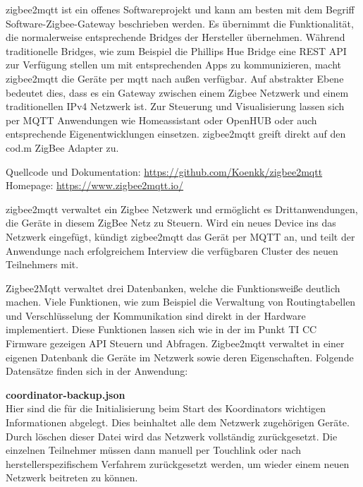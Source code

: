zigbee2mqtt ist ein offenes Softwareprojekt und kann am besten mit dem Begriff \grqq Software-Zigbee-Gateway\grqq{} beschrieben werden. Es übernimmt die Funktionalität, die normalerweise entsprechende
Bridges der Hersteller übernehmen. Während traditionelle Bridges, wie zum Beispiel die Phillips Hue Bridge eine REST API zur Verfügung stellen um mit entsprechenden
Apps zu kommunizieren, macht zigbee2mqtt die Geräte per mqtt nach außen verfügbar. Auf abstrakter Ebene bedeutet dies, dass es ein Gateway zwischen einem Zigbee Netzwerk und
einem traditionellen IPv4 Netzwerk ist. Zur Steuerung und Visualisierung lassen sich per MQTT Anwendungen wie \grqq Homeassistant\grqq{} oder \grqq OpenHUB\grqq{} oder auch entsprechende
Eigenentwicklungen einsetzen. \grqq zigbee2mqtt\grqq{} greift direkt auf den \grqq cod.m\grqq{} ZigBee Adapter zu.

Quellcode und Dokumentation: \url{https://github.com/Koenkk/zigbee2mqtt}
Homepage: \url{https://www.zigbee2mqtt.io/}

\grqq zigbee2mqtt\grqq{} verwaltet ein Zigbee Netzwerk und ermöglicht es Drittanwendungen, die Geräte in diesem ZigBee Netz zu Steuern. Wird ein neues Device ins das Netzwerk eingefügt, 
kündigt zigbee2mqtt das Gerät per MQTT an, und teilt der Anwendunge nach erfolgreichem Interview die verfügbaren Cluster des neuen Teilnehmers mit.

Zigbee2Mqtt verwaltet drei Datenbanken, welche die Funktionsweiße deutlich machen. Viele Funktionen, wie zum Beispiel die Verwaltung von Routingtabellen und
Verschlüsselung der Kommunikation sind direkt in der Hardware implementiert. Diese Funktionen lassen sich wie in der im Punkt TI CC Firmware gezeigen API Steuern und Abfragen.
Zigbee2mqtt verwaltet in einer eigenen Datenbank die Geräte im Netzwerk sowie deren Eigenschaften.
Folgende Datensätze finden sich in der Anwendung:

\textbf{coordinator-backup.json}\\

Hier sind die für die Initialisierung beim Start des Koordinators wichtigen Informationen abgelegt. Dies beinhaltet alle dem Netzwerk zugehörigen Geräte.
Durch löschen dieser Datei wird das Netzwerk vollständig zurückgesetzt. Die einzelnen Teilnehmer müssen dann manuell per Touchlink oder nach herstellerspezifischem Verfahrem
zurückgesetzt werden, um wieder einem neuen Netzwerk beitreten zu können.


